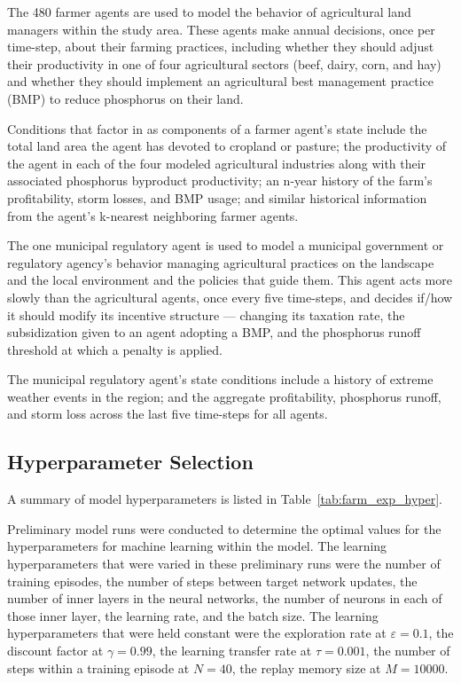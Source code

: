 The 480 farmer agents are used to model the behavior of agricultural land 
managers within the study area. 
These agents make annual decisions, once per time-step, 
about their farming practices, 
including whether they should adjust their productivity in one of four 
agricultural sectors (beef, dairy, corn, and hay) 
and whether they should implement an agricultural best management practice 
(BMP) to reduce phosphorus on their land.

Conditions that factor in as components of a farmer agent's state include the 
total land area the agent has devoted to cropland or pasture; 
the productivity of the agent in each of the four modeled agricultural 
industries along with their associated phosphorus byproduct productivity; 
an n-year history of the farm's profitability, storm losses, and BMP usage; 
and similar historical information from the agent's k-nearest neighboring
farmer agents.

The one municipal regulatory agent is used to model a municipal government or 
regulatory agency's behavior managing agricultural practices on the landscape 
and the local environment and the policies that guide them. 
This agent acts more slowly than the agricultural agents, 
once every five time-steps, and decides if/how it should modify its incentive 
structure --- changing its taxation rate, the subsidization given to an agent 
adopting a BMP, and the phosphorus runoff threshold at which a penalty is 
applied.

The municipal regulatory agent's state conditions include a history of 
extreme weather events in the region; and the aggregate profitability, 
phosphorus runoff, and storm loss across the last five time-steps for all 
agents.

\subsection{Hyperparameter Selection}
\label{subsec:farm_exp_hyper}

A summary of model hyperparameters is listed in Table~\ref{tab:farm_exp_hyper}.

Preliminary model runs were conducted to determine the optimal values for
the hyperparameters for machine learning within the model.
The learning hyperparameters that were varied in these preliminary runs were
the number of training episodes,
the number of steps between target network updates,
the number of inner layers in the neural networks,
the number of neurons in each of those inner layer,
the learning rate,
and the batch size.
The learning hyperparameters that were held constant were
the exploration rate at $\varepsilon = 0.1$,
the discount factor at $\gamma = 0.99$,
the learning transfer rate at $\tau = 0.001$,
the number of steps within a training episode at $N = 40$,
the replay memory size at $M = 10000$.

